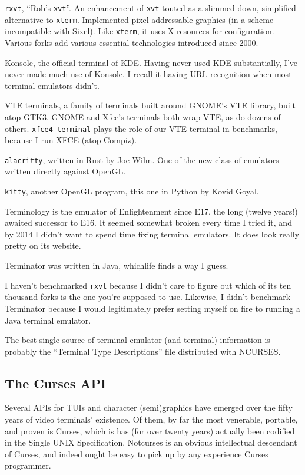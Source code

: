 \begin{denseitemize}
\item{\texttt{rxvt}, ``Rob's \texttt{xvt}''. An enhancement of \texttt{xvt} touted
    as a slimmed-down, simplified alternative to \texttt{xterm}. Implemented pixel-addressable
    graphics (in a scheme incompatible with Sixel). Like \texttt{xterm}, it uses
    X resources for configuration. Various forks add various essential technologies
    introduced since 2000.}
\item{Konsole, the official terminal of KDE. Having never used KDE substantially,
   I've never made much use of Konsole. I recall it having URL recognition
   when most terminal emulators didn't.}
\item{VTE terminals, a family of terminals built around GNOME's VTE library, built
  atop GTK3. GNOME and Xfce's terminals both wrap VTE, as do dozens of others.
  \texttt{xfce4-terminal} plays the role of our VTE terminal in benchmarks, because
  I run XFCE (atop Compiz).}
\item{\texttt{alacritty}, written in Rust by Joe Wilm. One of the new class of
    emulators written directly against OpenGL.}
\item{\texttt{kitty}, another OpenGL program, this one in Python by Kovid Goyal.}
\item{Terminology is the emulator of Enlightenment since E17, the long (twelve
    years!) awaited successor to E16. It seemed somewhat broken every time I
    tried it, and by 2014 I didn't want to spend time fixing terminal emulators.
    It does look really pretty on its website\cite{terminology}.}
\item{Terminator was written in Java, which\textellipsis life finds a way I guess.}
\end{denseitemize}

I haven't benchmarked \texttt{rxvt} because I didn't care to figure out which of
its ten thousand forks is the one you're supposed to use. Likewise, I didn't
benchmark Terminator because I would legitimately prefer setting myself on fire
to running a Java terminal emulator.

The best single source of terminal emulator (and terminal) information is
probably the ``Terminal Type Descriptions'' file distributed with NCURSES\cite{termdescript}.

\subsection{The Curses API}
Several APIs for TUIs and character (semi)graphics have emerged over the fifty
years of video terminals' existence. Of them, by far the most venerable,
portable, and proven is Curses, which is has (for over twenty years) actually
been codified in the Single UNIX Specification. Notcurses is an obvious
intellectual descendant of Curses, and indeed ought be easy to pick up by any
experience Curses programmer.

